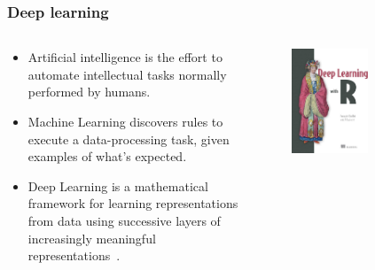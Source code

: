 \documentclass[aspectratio=169]{beamer}
\begin{document}
\begin{frame}
    \frametitle{Deep learning}
    \begin{columns}
        \begin{column}{0.5\textwidth}
            \begin{itemize}
                \item Artificial intelligence is the effort to automate 
                    intellectual tasks normally performed by humans.
                \item Machine Learning discovers rules to execute a 
                    data-processing task, given examples of what's expected.
                \item Deep Learning is a mathematical framework for learning
                    representations from data using successive layers of 
                    increasingly meaningful representations~\cite{chollet2018}.
            \end{itemize}
        \end{column}
        \begin{column}{0.5\textwidth}
            \begin{figure}
                \centering
                \includegraphics[width=0.6\textwidth]{img/chollet2018.jpg}
            \end{figure}
        \end{column}
    \end{columns}
\end{frame}
\end{document}
